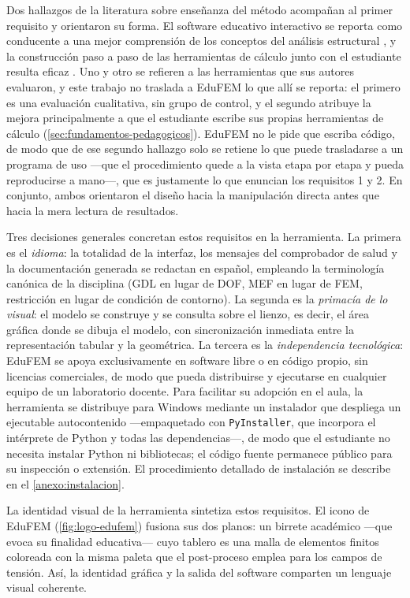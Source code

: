 Dos hallazgos de la literatura sobre enseñanza del método acompañan al primer requisito y orientaron su forma. El software educativo interactivo se reporta como conducente a una mejor comprensión de los conceptos del análisis estructural \autocite[p.~168]{lee2015interactive}, y la construcción paso a paso de las herramientas de cálculo junto con el estudiante resulta eficaz \autocite[p.~17]{bishay2020teaching}. Uno y otro se refieren a las herramientas que sus autores evaluaron, y este trabajo no traslada a EduFEM lo que allí se reporta: el primero es una evaluación cualitativa, sin grupo de control, y el segundo atribuye la mejora principalmente a que el estudiante escribe sus propias herramientas de cálculo (\autoref{sec:fundamentos-pedagogicos}). EduFEM no le pide que escriba código, de modo que de ese segundo hallazgo solo se retiene lo que puede trasladarse a un programa de uso —que el procedimiento quede a la vista etapa por etapa y pueda reproducirse a mano—, que es justamente lo que enuncian los requisitos 1 y 2. En conjunto, ambos orientaron el diseño hacia la manipulación directa antes que hacia la mera lectura de resultados.

Tres decisiones generales concretan estos requisitos en la herramienta. La primera es el \emph{idioma}: la totalidad de la interfaz, los mensajes del comprobador de salud y la documentación generada se redactan en español, empleando la terminología canónica de la disciplina (GDL en lugar de DOF, MEF en lugar de FEM, restricción en lugar de condición de contorno). La segunda es la \emph{primacía de lo visual}: el modelo se construye y se consulta sobre el lienzo, es decir, el área gráfica donde se dibuja el modelo, con sincronización inmediata entre la representación tabular y la geométrica. La tercera es la \emph{independencia tecnológica}: EduFEM se apoya exclusivamente en software libre o en código propio, sin licencias comerciales, de modo que pueda distribuirse y ejecutarse en cualquier equipo de un laboratorio docente. Para facilitar su adopción en el aula, la herramienta se distribuye para Windows mediante un instalador que despliega un ejecutable autocontenido —empaquetado con \texttt{PyInstaller}, que incorpora el intérprete de Python y todas las dependencias—, de modo que el estudiante no necesita instalar Python ni bibliotecas; el código fuente permanece público para su inspección o extensión. El procedimiento detallado de instalación se describe en el \autoref{anexo:instalacion}.

La identidad visual de la herramienta sintetiza estos requisitos. El icono de EduFEM (\autoref{fig:logo-edufem}) fusiona sus dos planos: un birrete académico —que evoca su finalidad educativa— cuyo tablero es una malla de elementos finitos coloreada con la misma paleta que el post-proceso emplea para los campos de tensión. Así, la identidad gráfica y la salida del software comparten un lenguaje visual coherente.

